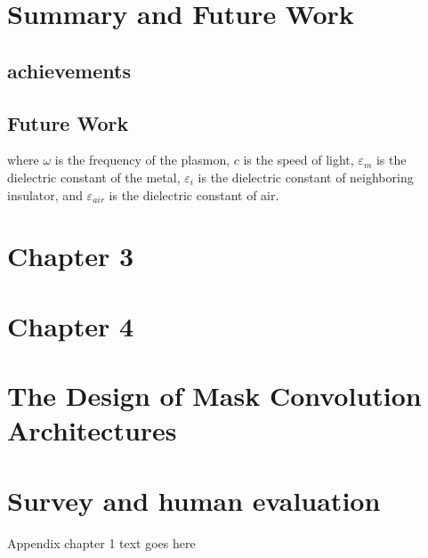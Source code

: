 \documentclass[phd,tocprelim]{cornell}
\begin{document}
\chapter{Summary and Future Work}
\section{achievements}
\section{Future Work}
\noindent
where $\omega$ is the frequency of the plasmon, $c$ is the speed of
light, $\varepsilon_m$ is the dielectric constant of the metal,
$\varepsilon_i$ is the dielectric constant of neighboring insulator,
and $\varepsilon_{air}$ is the dielectric constant of air.



\chapter{Chapter 3}

\chapter{Chapter 4}

\appendix
\chapter{The Design of Mask Convolution Architectures}
\chapter{Survey and human evaluation}
Appendix chapter 1 text goes here

%

%



%
\end{document}
